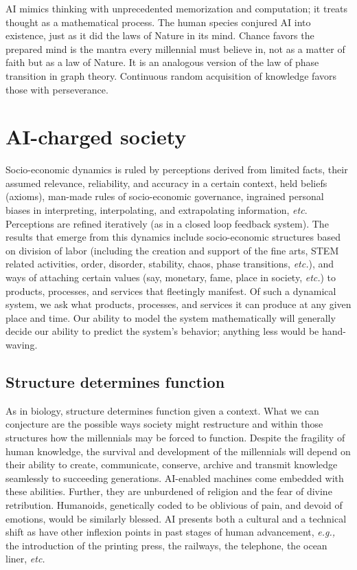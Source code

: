 \begin{multicols}{2}
AI mimics thinking with unprecedented memorization and computation; it treats thought as a mathematical process. The human species conjured AI into existence, just as it did the laws of Nature in its mind. Chance favors the prepared mind is the mantra every millennial must believe in, not as a matter of faith but as a law of Nature. It is an analogous version of the law of phase transition in graph theory. Continuous random acquisition of knowledge favors those with perseverance.\\[-24pt]

\section{AI-charged society}

\vskip -4pt

Socio-economic dynamics is ruled by perceptions derived from limited facts, their assumed relevance, reliability, and accuracy in a certain context, held beliefs (axioms), man-made rules of socio-economic governance, ingrained personal biases in interpreting, interpolating, and extrapolating information, \textit{etc}. Perceptions are refined iteratively (as in a closed loop feedback system). The results that emerge from this dynamics include socio-economic structures based on division of labor (including the creation and support of the fine arts, STEM related activities, order, disorder, stability, chaos, phase transitions, \textit{etc.}), and ways of attaching certain values (say, monetary, fame, place in society, \textit{etc.}) to products, processes, and services that fleetingly manifest. Of such a dynamical system, we ask what products, processes, and services it can produce at any given place and time. Our ability to model the system mathematically will generally decide our ability to predict the system's behavior; anything less would be hand-waving.\\[-24pt]

\subsection*{Structure determines function}

\vskip -4pt

As in biology, structure determines function given a context. What we can conjecture are the possible ways society might restructure and within those structures how the millennials may be forced to function. Despite the fragility of human knowledge, the survival and development of the millennials will depend on their ability to create, communicate, conserve, archive and transmit knowledge seamlessly to succeeding generations. AI-enabled machines come embedded with these abilities. Further, they are unburdened of religion and the fear of divine retribution. Humanoids, genetically coded to be oblivious of pain, and devoid of emotions, would be similarly blessed. AI presents both a cultural and a technical shift as have other inflexion points in past stages of human advancement, \textit{e.g.,} the introduction of the printing press, the railways, the telephone, the ocean liner, \textit{etc.} 


\end{multicols}
